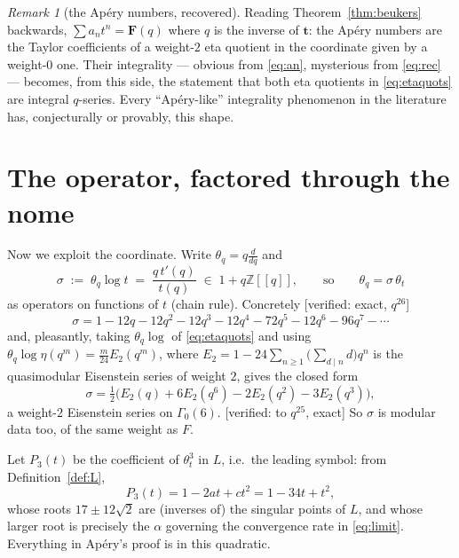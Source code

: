 \documentclass[11pt,reqno]{amsart}
\theoremstyle{plain}
\theoremstyle{definition}
\theoremstyle{remark}
\newtheorem{remark}[theorem]{Remark}
\newcommand{\Z}{\mathbb{Z}}
\newcommand{\Ver}[1]{\textup{\textsf{[verified: #1]}}}
\newcommand{\ta}{\theta_t}
\newcommand{\tq}{\theta_q}
\numberwithin{equation}{section}
\begin{document}
\begin{remark}[the Ap\'ery numbers, recovered]
Reading Theorem~\ref{thm:beukers} backwards, $\sum a_nt^n=\mathbf F(q)$ where
$q$ is the inverse of $\mathbf t$: the Ap\'ery numbers are the Taylor
coefficients of a weight-$2$ eta quotient in the coordinate given by a weight-$0$
one. Their integrality --- obvious from \eqref{eq:an}, mysterious from
\eqref{eq:rec} --- becomes, from this side, the statement that both eta
quotients in \eqref{eq:etaquots} are integral $q$-series. Every ``$\!$Ap\'ery-like''
integrality phenomenon in the literature has, conjecturally or provably, this
shape.
\end{remark}

\section{The operator, factored through the nome}\label{sec:factor}

Now we exploit the coordinate. Write $\tq=q\frac{d}{dq}$ and
\begin{equation}\label{eq:sigma}
  \sigma\;:=\;\tq\log t\;=\;\frac{q\,t'(q)}{t(q)}\;\in\;1+q\Z[[q]],
  \qquad\text{so}\qquad \tq=\sigma\,\ta
\end{equation}
as operators on functions of $t$ (chain rule). Concretely \Ver{exact, $q^{26}$}
\begin{equation}\label{eq:sigmaexp}
  \sigma=1-12q-12q^2-12q^3-12q^4-72q^5-12q^6-96q^7-\cdots
\end{equation}
and, pleasantly, taking $\tq\log$ of \eqref{eq:etaquots} and using
$\tq\log\eta(q^m)=\tfrac{m}{24}E_2(q^m)$, where
$E_2=1-24\sum_{n\ge1}\bigl(\sum_{d\mid n}d\bigr)q^n$
is the quasimodular Eisenstein series of weight $2$, gives the closed form
\begin{equation}\label{eq:sigmaeis}
  \sigma=\tfrac12\bigl(E_2(q)+6E_2(q^{6})-2E_2(q^{2})-3E_2(q^{3})\bigr),
\end{equation}
a weight-$2$ Eisenstein series on $\Gamma_0(6)$. \Ver{to $q^{25}$, exact}
So $\sigma$ is modular data too, of the same weight as $F$.

Let $P_3(t)$ be the coefficient of $\ta^3$ in $L$, i.e.\ the leading symbol:
from Definition~\ref{def:L},
\begin{equation}\label{eq:P3}
  P_3(t)=1-2at+ct^2=1-34t+t^2,
\end{equation}
whose roots $17\pm12\sqrt2$ are (inverses of) the singular points of $L$, and
whose larger root is precisely the $\alpha$ governing the convergence rate in
\eqref{eq:limit}. Everything in Ap\'ery's proof is in this quadratic.
\end{document}
